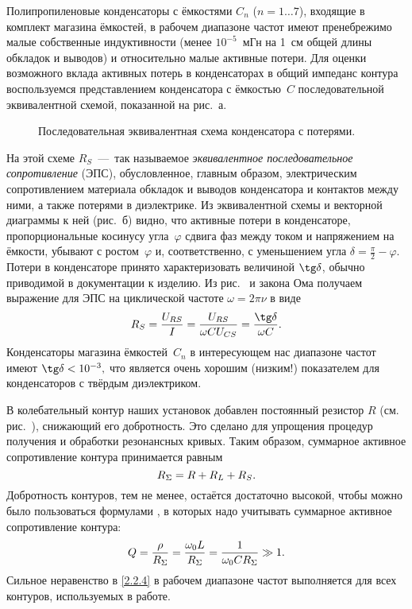 Полипропиленовые конденсаторы с ёмкостями $C_n$ ($n=1\ldots7$), 
входящие в комплект магазина ёмкостей, в рабочем диапазоне частот имеют 
пренебрежимо малые собственные индуктивности (менее $10^{-5}$~мГн на 1~см общей длины обкладок и
выводов) и относительно малые активные потери. Для оценки возможного вклада
активных потерь в конденсаторах в общий импеданс контура воспользуемся
представлением конденсатора с ёмкостью~$C$ последовательной эквивалентной
схемой, показанной на рис.~а.
\begin{figure}[h!]
    \centering
	\caption{Последовательная эквивалентная схема конденсатора с потерями.}
\end{figure}
На этой схеме $R_S$~---~так называемое \emph{эквивалентное последовательное
сопротивление} (ЭПС), обусловленное, главным образом, электрическим
сопротивлением материала обкладок и выводов конденсатора и контактов между ними,
а также потерями в диэлектрике. Из эквивалентной схемы и векторной диаграммы к
ней (рис.~б) видно, что активные потери в конденсаторе,
пропорциональные косинусу угла~$\varphi$ сдвига фаз между током и
напряжением на ёмкости, убывают с ростом~$\varphi$ и, соответственно, с
уменьшением угла $\delta=\frac{\pi}{2}-\varphi$. Потери в конденсаторе принято
характеризовать величиной $\tg\delta$, обычно приводимой в документации к
изделию. Из рис.~ и закона Ома получаем 
выражение для ЭПС на циклической частоте $\omega=2\pi \nu$ в виде
\begin{equation}\eqmark{2.2.1}
R_S=\dfrac{U_{RS}}{I}=\dfrac{U_{RS}}{\omega CU_{CS}}=\dfrac{\tg\delta}{\omega C}.
\end{equation}
Конденсаторы магазина ёмкостей~$C_n$ в интересующем нас диапазоне частот имеют
$\tg\delta<10^{-3},$ что является очень хорошим (низким!) показателем для
конденсаторов с твёрдым диэлектриком.

В колебательный контур наших установок добавлен постоянный резистор $R$ (см.
рис.~), снижающий его добротность. Это сделано для упрощения
процедур получения и обработки резонансных кривых. Таким образом, суммарное
активное сопротивление контура принимается равным
\begin{equation}\eqmark{2.2.2}
	R_{\Sigma}=R+R_L+R_S.
\end{equation}
Добротность контуров, тем не менее, остаётся достаточно высокой, чтобы можно
было пользоваться формулами , в которых
надо учитывать суммарное активное сопротивление контура:
\begin{equation}\eqmark{2.2.3}
	Q=\frac{\rho}{R_{\Sigma}}=\frac{\omega_0L}{R_{\Sigma}}=
    \frac{1}{\omega_0CR_{\Sigma}}\gg 1.
\end{equation}
Сильное неравенство в \eqref{2.2.4} в рабочем диапазоне частот выполняется для
всех контуров, используемых в работе.

